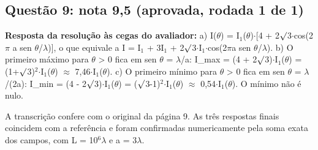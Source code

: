 \documentclass{article}%
\begin{document}
\subsection*{Questão 9: nota 9,5 (aprovada, rodada 1 de 1)}%
\textbf{Resposta da resolução às cegas do avaliador:} a) I($\theta$) = I$_{1}$($\theta$)$\cdot${[}4 + 2$\surd$3$\cdot$cos(2$\pi$ a sen $\theta$/$\lambda$){]}, o que equivale a I = I$_{1}$ + 3I$_{1}$ + 2$\surd$3$\cdot$I$_{1}$$\cdot$cos(2$\pi$a sen $\theta$/$\lambda$).\newline%
\newline%
b) O primeiro máximo para $\theta$ > 0 fica em sen $\theta$ = $\lambda$/a: I\_max = (4 + 2$\surd$3)$\cdot$I$_{1}$($\theta$) = (1+$\surd$3)$^2$$\cdot$I$_{1}$($\theta$) $\approx$ 7,46$\cdot$I$_{1}$($\theta$).\newline%
\newline%
c) O primeiro mínimo para $\theta$ > 0 fica em sen $\theta$ = $\lambda$/(2a): I\_min = (4 - 2$\surd$3)$\cdot$I$_{1}$($\theta$) = ($\surd$3-1)$^2$$\cdot$I$_{1}$($\theta$) $\approx$ 0,54$\cdot$I$_{1}$($\theta$). O mínimo não é nulo.\par %
A transcrição confere com o original da página 9. As três respostas finais coincidem com a referência e foram confirmadas numericamente pela soma exata dos campos, com L = 10$^{6}$$\lambda$ e a = 3$\lambda$.\newline%
\newline%
\end{document}
